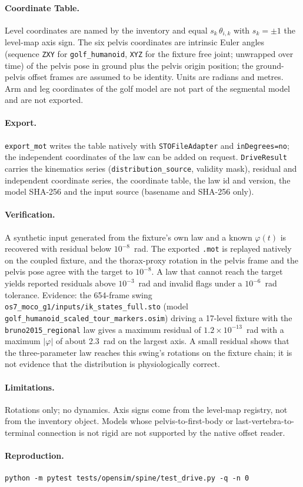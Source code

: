 \paragraph{Coordinate Table.}
Level coordinates are named by the inventory and equal
$s_k\,\theta_{i,k}$ with $s_k=\pm1$ the level-map axis sign. The six pelvis
coordinates are intrinsic Euler angles (sequence \texttt{ZXY} for
\texttt{golf\_humanoid}, \texttt{XYZ} for the fixture free joint; unwrapped
over time) of the pelvis pose in ground plus the pelvis origin position; the
ground-pelvis offset frames are assumed to be identity. Units are radians and
metres. Arm and leg coordinates of the golf model are not part of the
segmental model and are not exported.

\paragraph{Export.}
\texttt{export\_mot} writes the table natively with \texttt{STOFileAdapter}
and \texttt{inDegrees=no}; the independent coordinates of the law can be added
on request. \texttt{DriveResult} carries the kinematics series
(\texttt{distribution\_source}, validity mask), residual and independent
coordinate series, the coordinate table, the law id and version, the model
SHA-256 and the input source (basename and SHA-256 only).

\paragraph{Verification.}
A synthetic input generated from the fixture's own law and a known
$\varphi(t)$ is recovered with residual below $10^{-8}$~rad. The exported
\texttt{.mot} is replayed natively on the coupled fixture, and the
thorax-proxy rotation in the pelvis frame and the pelvis pose agree with the
target to $10^{-8}$. A law that cannot reach the target yields reported
residuals above $10^{-3}$~rad and invalid flags under a $10^{-6}$~rad
tolerance. Evidence: the 654-frame swing
\texttt{os7\_moco\_g1/inputs/ik\_states\_full.sto} (model
\texttt{golf\_humanoid\_scaled\_tour\_markers.osim}) driving a 17-level
fixture with the \texttt{bruno2015\_regional} law gives a maximum residual of
$1.2\times10^{-13}$~rad with a maximum $|\varphi|$ of about 2.3~rad on the
largest axis. A small residual shows that the three-parameter law reaches this
swing's rotations on the fixture chain; it is not evidence that the
distribution is physiologically correct.

\paragraph{Limitations.}
Rotations only; no dynamics. Axis signs come from the level-map registry, not
from the inventory object. Models whose pelvis-to-first-body or
last-vertebra-to-terminal connection is not rigid are not supported by the
native offset reader.

\paragraph{Reproduction.}
\begin{verbatim}
python -m pytest tests/opensim/spine/test_drive.py -q -n 0
\end{verbatim}
